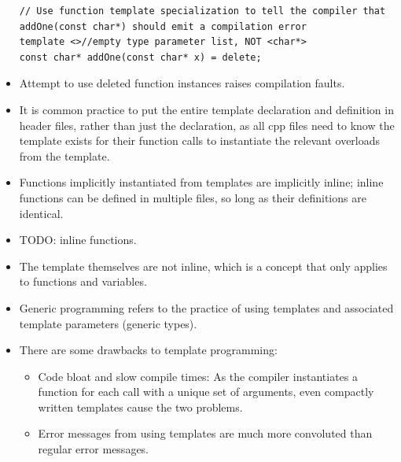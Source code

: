 \documentclass{report}
\begin{document}
\begin{itemize}
\begin{lstlisting}
// Use function template specialization to tell the compiler that addOne(const char*) should emit a compilation error
template <>//empty type parameter list, NOT <char*>
const char* addOne(const char* x) = delete;
\end{lstlisting}
\item Attempt to use deleted function instances raises compilation faults.
\item It is common practice to put the entire template declaration and definition in header files, rather than just the declaration, as all cpp files need to know the template exists for their function calls to instantiate the relevant overloads from the template.
\item Functions implicitly instantiated from templates are implicitly inline; inline functions can be defined in multiple files, so long as their definitions are identical.
\item TODO: inline functions.
\item The template themselves are not inline, which is a concept that only applies to functions and variables.
\item Generic programming refers to the practice of using templates and associated template parameters (generic types).
\item There are some drawbacks to template programming:
\begin{itemize}
    \item Code bloat and slow compile times: As the compiler instantiates a function for each call with a unique set of arguments, even compactly written templates cause the two problems.
    \item Error messages from using templates are much more convoluted than regular error messages.
\end{itemize}
\end{itemize}
\end{document}
